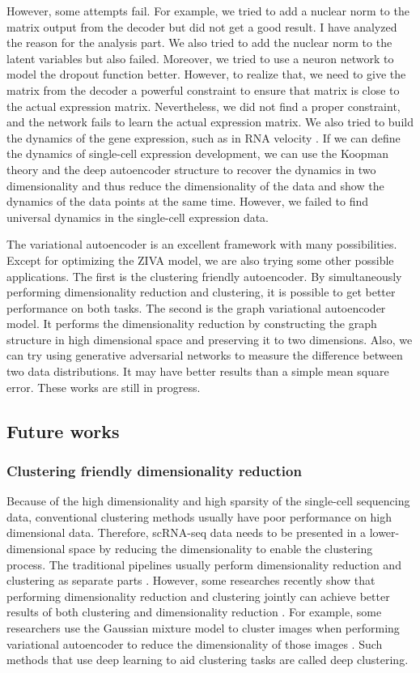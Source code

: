 However, some attempts fail. For example, we tried to add a nuclear norm to the matrix output from the decoder but did not get a good result. I have analyzed the reason for the analysis part. We also tried to add the nuclear norm to the latent variables but also failed. Moreover, we tried to use a neuron network to model the dropout function better. However, to realize that, we need to give the matrix from the decoder a powerful constraint to ensure that matrix is close to the actual expression matrix. Nevertheless, we did not find a proper constraint, and the network fails to learn the actual expression matrix. We also tried to build the dynamics of the gene expression, such as in RNA velocity \cite{la2018rna}. If we can define the dynamics of single-cell expression development, we can use the Koopman theory \cite{morton2018deep} and the deep autoencoder structure to recover the dynamics in two dimensionality \cite{lusch2018deep} and thus reduce the dimensionality of the data and show the dynamics of the data points at the same time. However, we failed to find universal dynamics in the single-cell expression data.  

The variational autoencoder is an excellent framework with many possibilities. Except for optimizing the ZIVA model, we are also trying some other possible applications. The first is the clustering friendly autoencoder. By simultaneously performing dimensionality reduction and clustering, it is possible to get better performance on both tasks. The second is the graph variational autoencoder model. It performs the dimensionality reduction by constructing the graph structure in high dimensional space and preserving it to two dimensions. Also, we can try using generative adversarial networks to measure the difference between two data distributions. It may have better results than a simple mean square error. These works are still in progress.

\subsection{Future works}

\subsubsection{Clustering friendly dimensionality reduction}
Because of the high dimensionality and high sparsity of the single-cell sequencing data, conventional clustering methods usually have poor performance on high dimensional data. Therefore, scRNA-seq data needs to be presented in a lower-dimensional space by reducing the dimensionality to enable the clustering process. The traditional pipelines usually perform dimensionality reduction and clustering as separate parts \cite{wu2020tools}. However, some researches recently show that performing dimensionality reduction and clustering jointly can achieve better results of both clustering and dimensionality reduction \cite{yang2017towards}. For example, some researchers use the Gaussian mixture model to cluster images when performing variational autoencoder to reduce the dimensionality of those images \cite{prasad2020variational}. Such methods that use deep learning to aid clustering tasks are called deep clustering.

